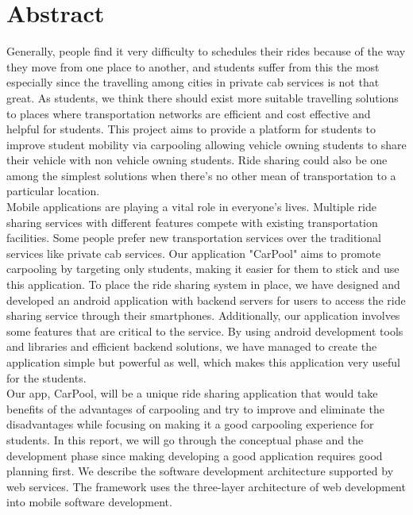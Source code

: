 \chapter*{Abstract}
Generally, people find it very difficulty to schedules their rides because of the way they move from one place to another, and students suffer from this the most  especially since the travelling among cities in private cab services is not that great. As students, we think there should exist more suitable travelling solutions to places where transportation networks are efficient and cost effective and helpful for students. This  project  aims to provide a  platform  for students to improve student  mobility  via carpooling allowing vehicle owning students to share their vehicle with non vehicle owning students. Ride sharing could also be one among the simplest solutions when there's no other  mean  of  transportation  to a  particular location. \\

Mobile applications are playing a vital role in everyone’s  lives. Multiple ride sharing services with different features compete with existing transportation facilities. Some people prefer new transportation services over the  traditional services like  private cab  services. Our application "CarPool"  aims  to  promote  carpooling  by  targeting  only students, making it easier for them to stick and use this application.  To place the ride sharing system in place, we have designed and developed an android application with backend servers for users  to  access  the ride sharing service through their smartphones. Additionally, our application  involves  some  features  that  are  critical to the service. By using android development tools and libraries and efficient backend solutions, we have managed to create the application simple but powerful as well, which makes this application very useful for the students. \\ 

Our app, CarPool, will be a unique ride sharing application that would take benefits of the advantages of carpooling and try to improve and eliminate the disadvantages while focusing on making it a good carpooling experience for students. In this report, we will go through the conceptual phase and the development phase since making developing a good application requires good planning first. We describe the software development architecture supported by web services. The framework uses the three-layer architecture of web development into mobile software development. 